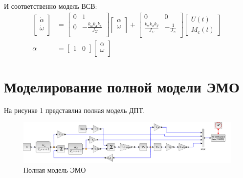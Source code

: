 \documentclass[a4paper, 12pt]{article}
\begin{document}
И соответственно модель ВСВ: 
\begin{align}
    \begin{bmatrix}
        \dot{\alpha} \\
        \dot{\omega} \\
    \end{bmatrix} & = 
    \begin{bmatrix}
        0 & 1 \\
        0 & -\frac{k_\text{м}k_\text{д}k_e}{J_\Sigma} \\
    \end{bmatrix}
    \begin{bmatrix}
        \alpha \\
        \omega \\
    \end{bmatrix} + 
    \begin{bmatrix}
        0 & 0 \\
        \frac{k_\text{м}k_\text{д}k_y}{J_\Sigma} & -\frac{1}{J_\Sigma} \\
    \end{bmatrix}
    \begin{bmatrix}
        U(t) \\
        M_c(t)
    \end{bmatrix} \\
    \alpha & = 
    \begin{bmatrix}
        1 & 0 
    \end{bmatrix}
    \begin{bmatrix}
        \alpha \\
        \omega \\
    \end{bmatrix}
\end{align}

\newpage
\section{Моделирование полной модели ЭМО}

На рисунке 1 представлна полная модель ДПТ.
\begin{figure}[h!]
    \centering
    \includegraphics[width = \textwidth]{images/FullModel/full-model.pdf}
    \caption{Полная модель ЭМО}
\end{figure}
\end{document}
